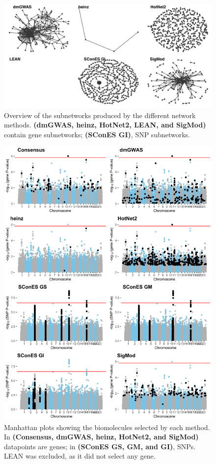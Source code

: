\documentclass[
  11pt,
]{env/yjiao}
\begin{document}
\begin{figure}
\centering
\includegraphics{fig/sfigure_2.png}
\caption{\label{fig:overview-solutions}Overview of the subnetworks produced by the different network methods. \textbf{(dmGWAS, heinz, HotNet2, LEAN, and SigMod)} contain gene subnetworks; \textbf{(SConES GI)}, SNP subnetworks.}
\end{figure}



\begin{figure}

{\centering \includegraphics[height=0.8\textheight]{fig/sfigure_3} 

}

\caption{Manhattan plots showing the biomolecules selected by each method. In \textbf{(Consensus, dmGWAS, heinz, HotNet2, and SigMod)} datapoints are genes; in \textbf{(SConES GS, GM, and GI)}, SNPs. LEAN was excluded, as it did not select any gene.}\label{fig:manhattan-solutions}
\end{figure}
\end{document}
